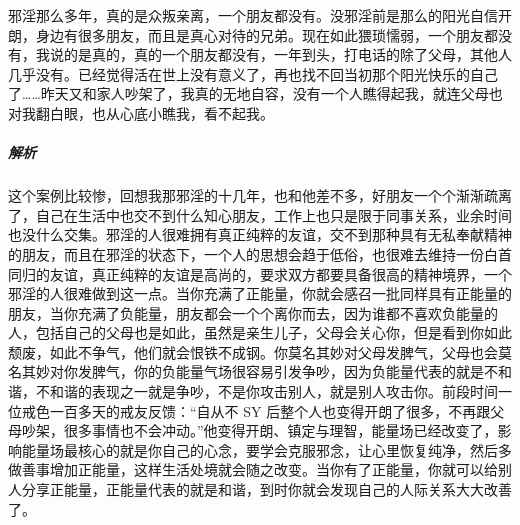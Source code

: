\begin{case}
    邪淫那么多年，真的是众叛亲离，一个朋友都没有。没邪淫前是那么的阳光自信开朗，身边有很多朋友，而且是真心对待的兄弟。现在如此猥琐懦弱，一个朋友都没有，我说的是真的，真的一个朋友都没有，一年到头，打电话的除了父母，其他人几乎没有。已经觉得活在世上没有意义了，再也找不回当初那个阳光快乐的自己了……昨天又和家人吵架了，我真的无地自容，没有一个人瞧得起我，就连父母也对我翻白眼，也从心底小瞧我，看不起我。
    \subparagraph{解析} 这个案例比较惨，回想我那邪淫的十几年，也和他差不多，好朋友一个个渐渐疏离了，自己在生活中也交不到什么知心朋友，工作上也只是限于同事关系，业余时间也没什么交集。邪淫的人很难拥有真正纯粹的友谊，交不到那种具有无私奉献精神的朋友，而且在邪淫的状态下，一个人的思想会趋于低俗，也很难去维持一份白首同归的友谊，真正纯粹的友谊是高尚的，要求双方都要具备很高的精神境界，一个邪淫的人很难做到这一点。当你充满了正能量，你就会感召一批同样具有正能量的朋友，当你充满了负能量，朋友都会一个个离你而去，因为谁都不喜欢负能量的人，包括自己的父母也是如此，虽然是亲生儿子，父母会关心你，但是看到你如此颓废，如此不争气，他们就会恨铁不成钢。你莫名其妙对父母发脾气，父母也会莫名其妙对你发脾气，你的负能量气场很容易引发争吵，因为负能量代表的就是不和谐，不和谐的表现之一就是争吵，不是你攻击别人，就是别人攻击你。前段时间一位戒色一百多天的戒友反馈：“自从不 SY 后整个人也变得开朗了很多，不再跟父母吵架，很多事情也不会冲动。”他变得开朗、镇定与理智，能量场已经改变了，影响能量场最核心的就是你自己的心念，要学会克服邪念，让心里恢复纯净，然后多做善事增加正能量，这样生活处境就会随之改变。当你有了正能量，你就可以给别人分享正能量，正能量代表的就是和谐，到时你就会发现自己的人际关系大大改善了。
\end{case}

